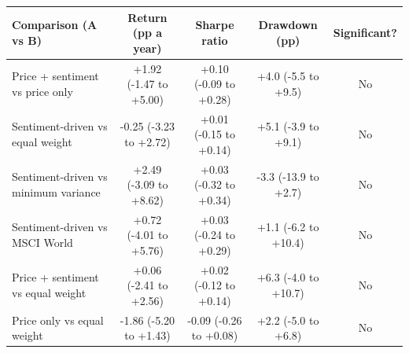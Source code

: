 \begin{tabular}{lcccc}
\toprule
Comparison (A vs B) & Return (pp a year) & Sharpe ratio & Drawdown (pp) & Significant? \\
\midrule
Price + sentiment vs price only & +1.92 (-1.47 to +5.00) & +0.10 (-0.09 to +0.28) & +4.0 (-5.5 to +9.5) & No \\
Sentiment-driven vs equal weight & -0.25 (-3.23 to +2.72) & +0.01 (-0.15 to +0.14) & +5.1 (-3.9 to +9.1) & No \\
Sentiment-driven vs minimum variance & +2.49 (-3.09 to +8.62) & +0.03 (-0.32 to +0.34) & -3.3 (-13.9 to +2.7) & No \\
Sentiment-driven vs MSCI World & +0.72 (-4.01 to +5.76) & +0.03 (-0.24 to +0.29) & +1.1 (-6.2 to +10.4) & No \\
Price + sentiment vs equal weight & +0.06 (-2.41 to +2.56) & +0.02 (-0.12 to +0.14) & +6.3 (-4.0 to +10.7) & No \\
Price only vs equal weight & -1.86 (-5.20 to +1.43) & -0.09 (-0.26 to +0.08) & +2.2 (-5.0 to +6.8) & No \\
\bottomrule
\end{tabular}
